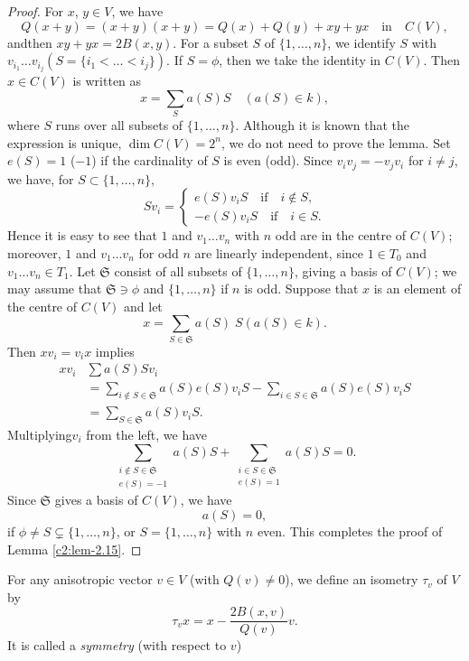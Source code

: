 \begin{proof}
For $x$, $y\in V$, we have
$$
Q(x+y)=(x+y)(x+y)=Q(x)+Q(y)+xy+yx\quad\text{in}\quad C(V),
$$
and\pageoriginale then $xy+yx=2B(x,y)$. For a subset $S$ of
$\{1,\ldots,n\}$, we identify $S$ with $v_{i_{1}}\ldots
v_{i_{j}}(S=\{i_{1}<\ldots<i_{j}\})$. If $S=\phi$, then we take the
identity in $C(V)$. Then $x\in C(V)$ is written as
$$
x=\sum_{S}a(S)S\quad (a(S)\in k),
$$
where $S$ runs over all subsets of $\{1,\ldots,n\}$. Although it is
known that the expression is unique, \iec $\dim C(V)=2^{n}$, we do not
need to prove the lemma. Set $e(S)=1$ (\resp $-1$) if the cardinality
of $S$ is even (\resp odd). Since $v_{i}v_{j}=-v_{j}v_{i}$ for $i\neq
j$, we have, for $S\subset \{1,\ldots,n\}$,
$$
Sv_{i}=
\begin{cases}
e(S)v_{i}S\quad\text{if}\quad i\not\in S,\\
-e(S)v_{i}S\quad\text{if}\quad i\in S.
\end{cases}
$$
Hence it is easy to see that $1$ and $v_{1}\ldots v_{n}$ with $n$ odd
are in the centre of $C(V)$; moreover, $1$ and $v_{1}\ldots v_{n}$ for
odd $n$ are linearly independent, since $1\in T_{0}$ and $v_{1}\ldots
v_{n}\in T_{1}$. Let $\mathfrak{S}$ consist of all subsets of
$\{1,\ldots,n\}$, giving a basis of $C(V)$; we may assume that
$\mathfrak{S}\ni \phi$ and $\{1,\ldots,n\}$ if $n$ is odd. Suppose
that $x$ is an element of the centre of $C(V)$ and let
$$
x=\sum_{S\in\mathfrak{S}} a(S) \; S(a(S)\in k).
$$
Then $xv_{i}=v_{i}x$ implies
\begin{align*}
xv_{i} & \sum a(S)Sv_{i}\\
 &= \sum_{i\not\in S\in\mathfrak{S}}a(S)e(S)v_{i}S-\sum_{i\in
  S\in\mathfrak{S}}a(S)e(S)v_{i}S\\
&= \sum_{S\in\mathfrak{S}}a(S)v_{i}S.
\end{align*}
Multiplying\pageoriginale $v_{i}$ from the left, we have
$$
\sum_{\substack{i\not\in
    S\in\mathfrak{S}\\ e(S)=-1}}a(S)S+\sum_{\substack{i\in
    S\in\mathfrak{S}\\ e(S)=1}}a(S)S=0.
$$
Since $\mathfrak{S}$ gives a basis of $C(V)$, we have
$$
a(S)=0,
$$
if $\phi\neq S\subsetneq \{1,\ldots,n\}$, or $S=\{1,\ldots,n\}$ with
$n$ even. This completes the proof of Lemma \ref{c2:lem-2.15}.
\end{proof}

For any anisotropic vector $v\in V$ (\ie with $Q(v)\neq 0$), we define
an isometry $\tau_{v}$ of $V$ by
$$
\tau_{v}x=x-\frac{2B(x,v)}{Q(v)}v.
$$
It is called a {\em symmetry} (with respect to $v$)

